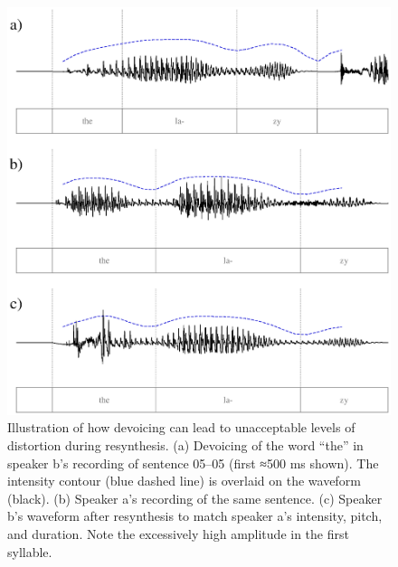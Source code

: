 \begin{figure}
	\begin{centering}
	\includegraphics{figures/devoicing/devoicing.eps}
	\caption[Syllable devoicing in resynthesis]{Illustration of how devoicing can lead to unacceptable levels of distortion during resynthesis.  (a) Devoicing of the word “the” in speaker \ac{b}’s recording of sentence 05–05 (first ≈500 ms shown).  The intensity contour (blue dashed line) is overlaid on the waveform (black).  (b) Speaker \ac{a}’s recording of the same sentence.  (c) Speaker \ac{b}’s waveform after resynthesis to match speaker \ac{a}’s intensity, pitch, and duration.  Note the excessively high amplitude in the first syllable.\label{fig:Devoicing}}
	\end{centering}
\end{figure}

